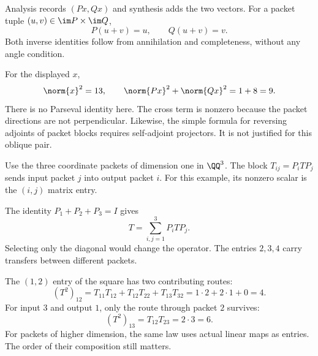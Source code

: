 
Analysis records $(Px,Qx)$ and synthesis adds the two vectors. For a packet tuple $(u,v)\in\im P\times\im Q$,
\[
P(u+v)=u,\qquad Q(u+v)=v.
\]
Both inverse identities follow from annihilation and completeness, without any angle condition.

For the displayed $x$,
\[
\norm{x}^2=13,\qquad \norm{Px}^2+\norm{Qx}^2=1+8=9.
\]
There is no Parseval identity here. The cross term is nonzero because the packet directions are not perpendicular. Likewise, the simple formula for reversing adjoints of packet blocks requires self-adjoint projectors. It is not justified for this oblique pair.


Use the three coordinate packets of dimension one in $\QQ^3$. The block $T_{ij}=P_iTP_j$ sends input packet $j$ into output packet $i$. For this example, its nonzero scalar is the $(i,j)$ matrix entry.


The identity $P_1+P_2+P_3=I$ gives
\[
T=\sum_{i,j=1}^3 P_iTP_j.
\]
Selecting only the diagonal would change the operator. The entries $2,3,4$ carry transfers between different packets.

The $(1,2)$ entry of the square has two contributing routes:
\[
(T^2)_{12}=T_{11}T_{12}+T_{12}T_{22}+T_{13}T_{32}
=1\cdot2+2\cdot1+0=4.
\]
For input $3$ and output $1$, only the route through packet $2$ survives:
\[
(T^2)_{13}=T_{12}T_{23}=2\cdot3=6.
\]
For packets of higher dimension, the same law uses actual linear maps as entries. The order of their composition still matters.


